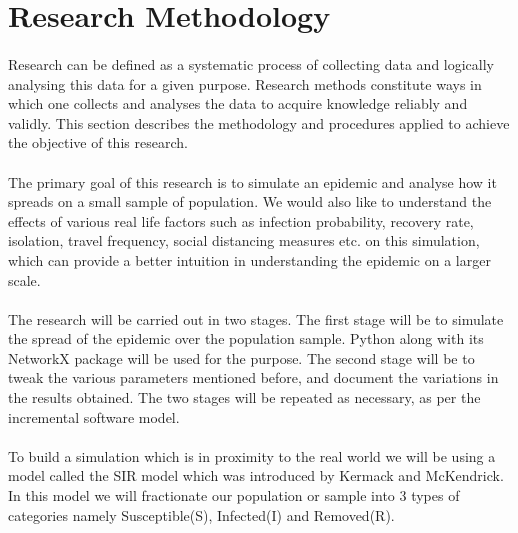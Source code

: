 \documentclass[14pt, a4paper]{extarticle}
\begin{document}
	\newpage
	\section{Research Methodology}
	    \paragraph{} Research can be defined as a systematic process of collecting data and logically analysing this data for a given purpose. Research methods constitute ways in which one collects and analyses the data to acquire knowledge reliably and validly. This section describes the methodology and procedures applied to achieve the objective of this research.

        \paragraph{} The primary goal of this research is to simulate an epidemic and analyse how it spreads on a small sample of population. We would also like to understand the effects of various real life factors such as infection probability, recovery rate, isolation, travel frequency, social distancing measures etc. on this simulation, which can provide a better intuition in understanding the epidemic on a larger scale.
        
        \paragraph{} The research will be carried out in two stages. The first stage will be to simulate the spread of the epidemic over the population sample. Python along with its NetworkX package will be used for the purpose. The second stage will be to tweak the various parameters mentioned before, and document the variations in the results obtained. The two stages will be repeated as necessary, as per the incremental software model.
        
        \paragraph{} To build a simulation which is in proximity to the real world we will be using a model called the SIR model which was introduced by Kermack and McKendrick. In this model we will fractionate our population or sample into 3 types of categories namely Susceptible(S), Infected(I) and Removed(R).
        
\end{document}
